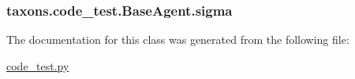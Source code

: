 \subsubsection[{\texorpdfstring{sigma}{sigma}}]{\setlength{\rightskip}{0pt plus 5cm}taxons.\+code\+\_\+test.\+Base\+Agent.\+sigma}\hypertarget{classtaxons_1_1code__test_1_1_base_agent_a7ae0a7c58908d5475b5a4818fe98e45a}{}\label{classtaxons_1_1code__test_1_1_base_agent_a7ae0a7c58908d5475b5a4818fe98e45a}


The documentation for this class was generated from the following file\+:\begin{DoxyCompactItemize}
\item 
\hyperlink{code__test_8py}{code\+\_\+test.\+py}\end{DoxyCompactItemize}
